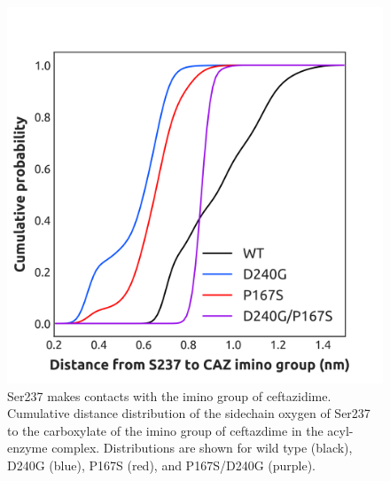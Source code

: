 \documentclass[../main.tex]{subfiles}
\begin{document}
    \begin{figure}[!htb] %
        \centering
        \includegraphics[width=5in]{ch2-suppfig2.png}
        \caption[Ser237 makes contacts with the imino group of ceftazidime.]{Ser237 makes contacts with the imino group of ceftazidime. Cumulative distance distribution of the sidechain oxygen of Ser237 to the carboxylate of the imino group of ceftazdime in the acyl-enzyme complex. Distributions are shown for wild type (black), D240G (blue), P167S (red), and P167S/D240G (purple).}
        \label{fig:ch2-suppfig2}
    \end{figure} 
\end{document}
